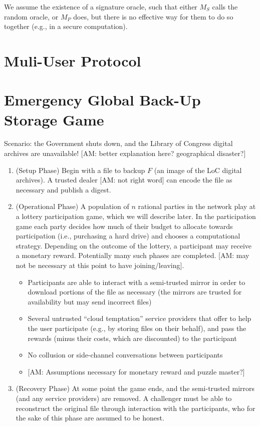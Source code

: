 \documentclass[]{article}
\newcommand{\anote}[1]{{\color{magenta}[AM: #1]}}
\theoremstyle{remark}
\begin{document}
We assume the existence of a signature oracle, such that either $M_S$ calls the random oracle, or $M_P$ does, but there is no effective way for them to do so together (e.g., in a secure computation).

\section{Muli-User Protocol}




\section{Emergency Global Back-Up Storage Game}

Scenario: the Government shuts down, and the Library of Congress digital archives are unavailable! \anote{better explanation here? geographical disaster?}

\begin{enumerate}
\item (Setup Phase) Begin with a file to backup $F$ (an image of the LoC digital archives). A trusted dealer \anote{not right word} can encode the file as necessary and publish a digest.
\item (Operational Phase) A population of $n$ rational parties in the network play at a lottery participation game, which we will describe later. In the participation game each party decides how much of their budget to allocate towards participation (i.e., purchasing a hard drive) and chooses a computational strategy. Depending on the outcome of the lottery, a participant may receive a monetary reward. Potentially many such phases are completed.  \anote{may not be necessary at this point to have joining/leaving}.
  \begin{itemize}
  \item Participants are able to interact with a semi-trusted mirror in order to download portions of the file as necessary (the mirrors are trusted for availability but may send incorrect files)
  \item Several untrusted ``cloud temptation'' service providers that offer to help the user participate (e.g., by storing files on their behalf), and pass the rewards (minus their costs, which are discounted) to the participant
  \item No collusion or side-channel conversations between participants
  \item \anote{Assumptions necessary for monetary reward and puzzle master?}
  \end{itemize}
\item (Recovery Phase) At some point the game ends, and the semi-trusted mirrors (and any service providers) are removed. A challenger must be able to reconstruct the original file through interaction with the participants, who for the sake of this phase are assumed to be honest.
\end{enumerate}
\end{document}
